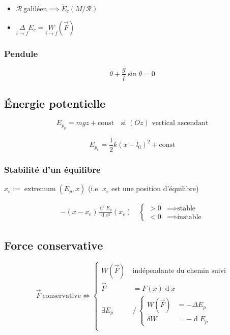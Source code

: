 \documentclass{article}
\renewcommand{\d}{\operatorname{d}}
\renewcommand{\vec}{\overrightarrow}
\begin{document}
\begin{itemize}
	\item $\mathcal{R}\ \text{galiléen} \implies \dot E_c(M/\mathcal R)$
	\item $\underset{i\to f}{\Delta}E_c = \underset{i\to f}{W}(\vec F)$
\end{itemize}	

\subsubsection{Pendule}
\[
	\ddot\theta + \frac{g}{l} \sin\theta = 0
\] 

\subsection{Énergie potentielle}


\[
	E_{p_p} = mgz + \text{const}\quad\text{si $(Oz)$ vertical ascendant}
\] 

\[
	E_{p_e} = \frac{1}{2}k(x-l_0)^2+\text{const}
\] 

\subsubsection{Stabilité d'un équilibre}

$x_e := \operatorname{extremum}(E_p, x)$ (i.e. $x_e$ est une position d'équilibre)

\begin{align*}
	-(x-x_e)\frac{\d^2 {E_p}}{\d x^2}(x_e)\quad \begin{cases}
		> 0 &\implies \text{stable} \\
		< 0 &\implies \text{instable}
	\end{cases}
\end{align*}

\subsection{Force conservative}
\[
	\vec F\ \text{conservative} \iff \begin{cases}
		W(\vec F)\ &\text{indépendante du chemin suivi} \\
		\vec F &= F(x)\d x \\
		\exists E_p \ &\text{/}\ \begin{cases}
			W(\vec F) &= -\Delta E_p \\
			\delta W &= -\d E_p
		\end{cases} \\
	\end{cases}
\] 
\end{document}
